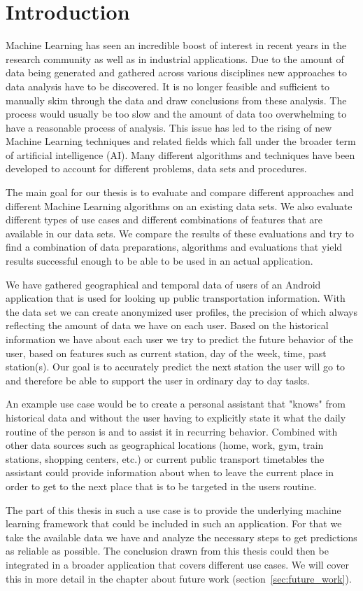 \section{Introduction}

Machine Learning has seen an incredible boost of interest in recent years in the research community as well as in industrial applications. Due to the amount of data being generated and gathered across various disciplines new approaches to data analysis have to be discovered. It is no longer feasible and sufficient to manually skim through the data and draw conclusions from these analysis. The process would usually be too slow and the amount of data too overwhelming to have a reasonable process of analysis. This issue has led to the rising of new Machine Learning techniques and related fields which fall under the broader term of artificial intelligence (AI). Many different algorithms and techniques have been developed to account for different problems, data sets and procedures.

The main goal for our thesis is to evaluate and compare different approaches and different Machine Learning algorithms on an existing data sets. We also evaluate different types of use cases and different combinations of features that are available in our data sets. We compare the results of these evaluations and try to find a combination of data preparations, algorithms and evaluations that yield results successful enough to be able to be used in an actual application. 

We have gathered geographical and temporal data of users of an Android application that is used for looking up public transportation information. With the data set we can create anonymized user profiles, the precision of which always reflecting the amount of data we have on each user. Based on the historical information we have about each user we try to predict the future behavior of the user, based on features such as current station, day of the week, time, past station(s). Our goal is to accurately predict the next station the user will go to and therefore be able to support the user in ordinary day to day tasks. 

An example use case would be to create a personal assistant that "knows" from historical data and without the user having to explicitly state it what the daily routine of the person is and to assist it in recurring behavior. Combined with other data sources such as geographical locations (home, work, gym, train stations, shopping centers, etc.) or current public transport timetables the assistant could provide information about when to leave the current place in order to get to the next place that is to be targeted in the users routine. 

The part of this thesis in such a use case is to provide the underlying machine learning framework that could be included in such an application. For that we take the available data we have and analyze the necessary steps to get predictions as reliable as possible. The conclusion drawn from this thesis could then be integrated in a broader application that covers different use cases. We will cover this in more detail in the chapter about future work (section~\ref{sec:future_work}).
